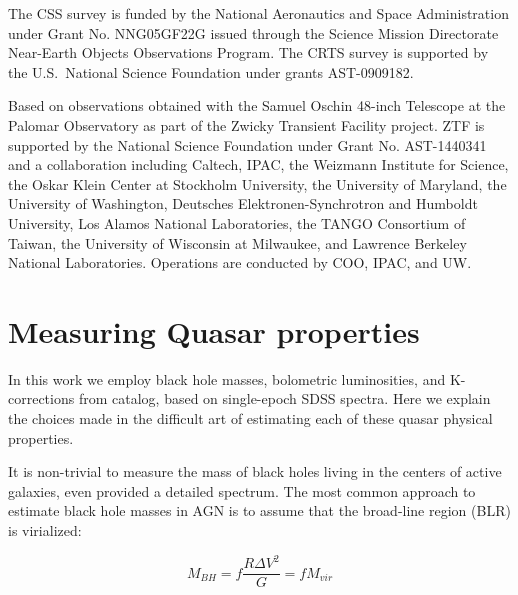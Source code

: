 \documentclass[twocolumn]{aastex62}
\begin{document}
The CSS survey is funded by the National Aeronautics and Space Administration under Grant No. NNG05GF22G issued through the Science Mission Directorate Near-Earth Objects Observations Program.  The CRTS survey is supported by the U.S.~National Science Foundation under grants AST-0909182.


Based on observations obtained with the Samuel Oschin 48-inch Telescope at the Palomar Observatory as part of the Zwicky Transient Facility project. ZTF is supported by the National Science Foundation under Grant No. AST-1440341 and a collaboration including Caltech, IPAC, the Weizmann Institute for Science, the Oskar Klein Center at Stockholm University, the University of Maryland, the University of Washington, Deutsches Elektronen-Synchrotron and Humboldt University, Los Alamos National Laboratories, the TANGO Consortium of Taiwan, the University of Wisconsin at Milwaukee, and Lawrence Berkeley National Laboratories. Operations are conducted by COO, IPAC, and UW.





\appendix
\section{Measuring Quasar properties} 
\label{app:measureBHmass}
In this work we employ black hole masses, bolometric luminosities, and K-corrections from \cite{shen2011} catalog, based on single-epoch SDSS spectra. Here we explain the choices made in the difficult art of estimating each of these quasar physical properties.

It is non-trivial to measure the mass of black holes living in the centers of active galaxies, even provided a detailed spectrum. The most common  approach to estimate black hole masses in AGN is to assume that the broad-line region (BLR) is virialized:


\begin{equation}
M_{BH} = f \frac{ R\Delta V^{2} }{G} = f M_{vir}
\end{equation}
\end{document}
